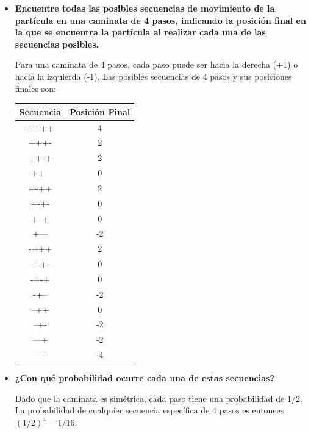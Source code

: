 \documentclass{article}
\begin{document}
\begin{itemize}
    \item \textbf{Encuentre todas las posibles secuencias de movimiento de la partícula en una
              caminata de 4 pasos, indicando la posición final en la que se encuentra la
              partícula al realizar cada una de las secuencias posibles.}

          Para una caminata de 4 pasos, cada paso puede ser hacia la derecha (+1) o hacia la izquierda (-1). Las posibles secuencias de 4 pasos y sus posiciones finales son:

          \begin{tabular}{c|c}
              Secuencia & Posición Final \\
              \hline
              ++++      & 4              \\
              +++-      & 2              \\
              ++-+      & 2              \\
              ++--      & 0              \\
              +-++      & 2              \\
              +-+-      & 0              \\
              +--+      & 0              \\
              +---      & -2             \\
              -+++      & 2              \\
              -++-      & 0              \\
              -+-+      & 0              \\
              -+--      & -2             \\
              --++      & 0              \\
              --+-      & -2             \\
              ---+      & -2             \\
              ----      & -4             \\
          \end{tabular}

    \item \textbf{¿Con qué probabilidad ocurre cada una de estas secuencias?}

          Dado que la caminata es simétrica, cada paso tiene una probabilidad de $1/2$. La probabilidad de cualquier secuencia específica de 4 pasos es entonces $(1/2)^4 = 1/16$.


\end{itemize}
\end{document}
